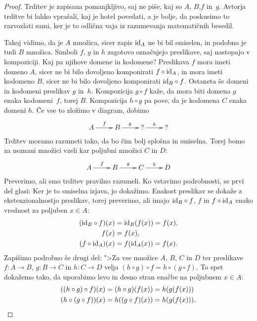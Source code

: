 \begin{proof}
  Trditev je zapisana pomanjkljivo, saj ne piše, kaj so $A$, $B$,$ f$ in~$g$. Avtorja
  trditve bi lahko vprašali, kaj je hotel povedati, a je bolje, da poskusimo to razvozlati
  sami, ker je to odlična vaja iz razumevanja matematičnih besedil.

  Takoj vidimo, da je $A$ množica, sicer zapis $\id[A]$ ne bi bil smiselen, in podobno je
  tudi $B$ množica. Simboli $f$, $g$ in $h$ zagotovo označujejo preslikave, saj nastopajo
  v kompoziciji. Kaj pa njihove domene in kodomene? Preslikava $f$ mora imeti domeno $A$,
  sicer ne bi bilo dovoljeno komponirati $f \circ \id[A]$, in mora imeti kodomeno $B$,
  sicer ne bi bilo dovoljeno komponirati $\id[B] \circ f$. Ostaneta še domeni in kodomeni
  preslikav $g$ in~$h$. Kompozicija $g \circ f$ kaže, da mora biti domena $g$ enaka
  kodomeni~$f$, torej $B$. Kompozicija $h \circ g$ pa pove, da je kodomena $C$ enaka
  domeni $h$. Če vse to zložimo v diagram, dobimo
  \begin{equation*}
    \xymatrix{
      {A} \ar[r]^{f}
      &
      {B} \ar[r]^{g}
      &
      {\text{?}} \ar[r]^{h}
      &
      {\text{?}}
    }
  \end{equation*}
  Trditev moramo razumeti tako, da bo čim bolj splošna in smiselna. Torej bomo za neznani
  množici vzeli kar poljubni množici $C$ in $D$:
  \begin{equation*}
    \xymatrix{
      {A} \ar[r]^{f}
      &
      {B} \ar[r]^{g}
      &
      {C} \ar[r]^{h}
      &
      {D}
    }
  \end{equation*}
  Preverimo, ali smo trditev pravilno razumeli. Ko vstavimo podrobnosti, se prvi del
  glasi: 
  Ker je to smiselna izjava, jo dokažimo. Enakost preslikav se dokaže z ekstenzionalnostjo
  preslikav, torej preverimo, ali imajo $\id[B] \circ f$, $f$ in $f \circ \id[A]$ enako
  vrednost za poljuben $x \in A$:
  \begin{align*}
    (\id[B] \circ f)(x) &= \id[B] (f (x)) = f (x), \\
    f (x) &= f(x), \\
    (f \circ \id[A])(x) &= f (\id[A](x)) = f(x).
  \end{align*}
  Zapišimo podrobno še drugi del: ">Za vse množice $A$, $B$, $C$ in $D$ ter preslikave
  $f : A \to B$, $g : B \to C$ in $h : C \to D$ velja
  $(h \circ g) \circ f = h \circ (g \circ f)$. To spet dokažemo tako, da uporabimo levo in
  desno stran enačbe na poljubnem $x \in A$:
  \begin{align*}
    ((h \circ g) \circ f)(x) &= (h \circ g)(f(x)) = h(g(f(x))) \\
    (h \circ (g \circ f))(x) &= h((g \circ f)(x)) = h(g(f(x))). \qedhere
  \end{align*}
\end{proof}




